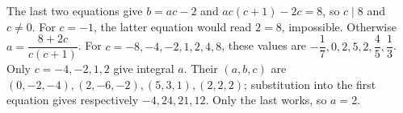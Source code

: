 The last two equations give $b=ac-2$ and $a c(c+1)-2c=8$, so $c\mid8$ and $c\ne0$. For $c=-1$, the latter equation would read $2=8$, impossible. Otherwise $a=\dfrac{8+2c}{c(c+1)}$. For $c=-8,-4,-2,1,2,4,8$, these values are $-\dfrac{1}{7},0,2,5,2,\dfrac{4}{5},\dfrac{1}{3}$. Only $c=-4,-2,1,2$ give integral $a$. Their $(a,b,c)$ are $(0,-2,-4),(2,-6,-2),(5,3,1),(2,2,2)$; substitution into the first equation gives respectively $-4,24,21,12$. Only the last works, so $a=\boxed2$.
